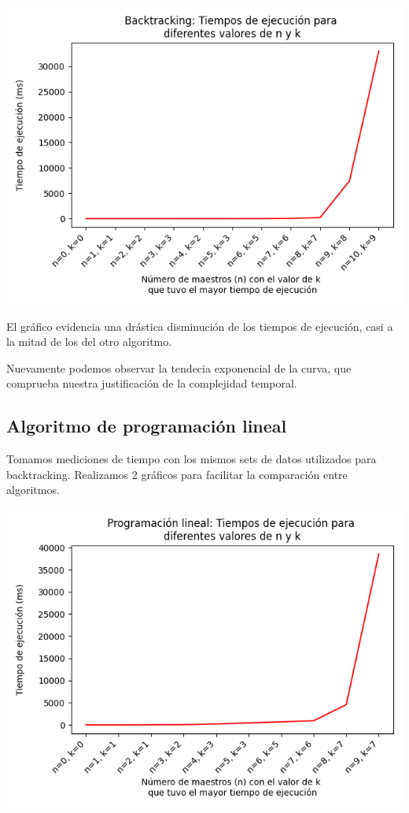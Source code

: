 \documentclass{article}
\begin{document}
\includegraphics[scale=0.60]{images/graficoBacktrackingGreedy.png}

El gráfico evidencia una drástica disminución de los tiempos de ejecución, casi a la mitad de los del otro algoritmo. 

Nuevamente podemos observar la tendecia exponencial de la curva, que comprueba nuestra justificación de la complejidad temporal.

\subsection{Algoritmo de programación lineal}

Tomamos mediciones de tiempo con los mismos sets de datos utilizados para backtracking. Realizamos 2 gráficos para facilitar la comparación entre algoritmos. 

\includegraphics[scale=0.60]{images/graficoProgramacionLinealSin10.png}
\end{document}
